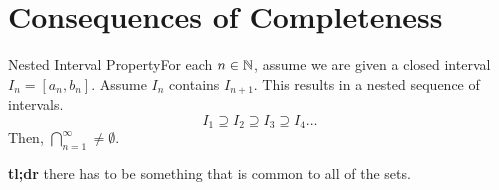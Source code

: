 
\renewcommand{\theenumi}{\arabic{enumi}}
\renewcommand{\labelenumi}{\theenumi.}
\section{Consequences of Completeness}

\begin{ntheorem}
    {Nested Interval Property}For each \(n \in \mathbb{N}\), assume we are given a closed interval \(I_n = [a_n, b_n]\). Assume \(I_n\) contains \(I_{n+1}\). This results in a nested sequence of intervals. \[I_1 \supseteq I_2 \supseteq I_3 \supseteq I_4\dots\] Then, \(\bigcap^\infty_{n=1} \ne \emptyset\).
\end{ntheorem}

\textbf{tl;dr} there has to be something that is common to all of the sets.

